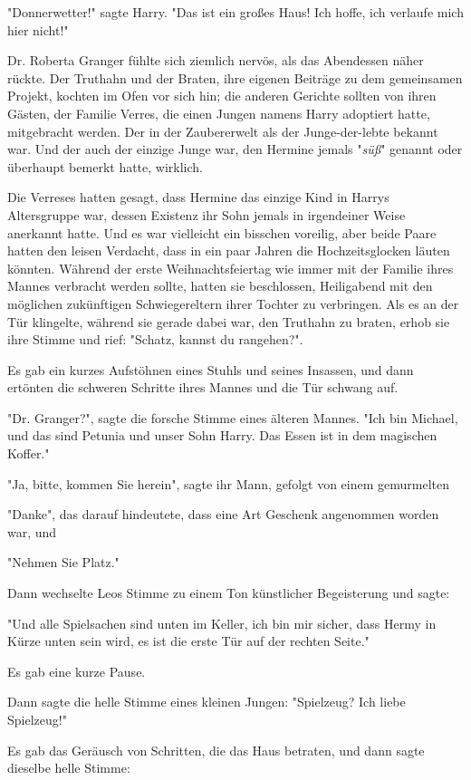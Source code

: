 {"Donnerwetter!" sagte Harry. "Das ist ein großes Haus! Ich hoffe, ich verlaufe mich hier nicht!"

Dr. Roberta Granger fühlte sich ziemlich nervös, als das Abendessen näher rückte. Der Truthahn und der Braten, ihre eigenen Beiträge zu dem gemeinsamen Projekt, kochten im Ofen vor sich hin; die anderen Gerichte sollten von ihren Gästen, der Familie Verres, die einen Jungen namens Harry adoptiert hatte, mitgebracht werden. Der in der Zaubererwelt als der Junge-der-lebte bekannt war. Und der auch der einzige Junge war, den Hermine jemals "\emph{süß}" genannt oder überhaupt bemerkt hatte, wirklich.

Die Verreses hatten gesagt, dass Hermine das einzige Kind in Harrys Altersgruppe war, dessen Existenz ihr Sohn jemals in irgendeiner Weise anerkannt hatte. Und es war vielleicht ein bisschen voreilig, aber beide Paare hatten den leisen Verdacht, dass in ein paar Jahren die Hochzeitsglocken läuten könnten. Während der erste Weihnachtsfeiertag wie immer mit der Familie ihres Mannes verbracht werden sollte, hatten sie beschlossen, Heiligabend mit den möglichen zukünftigen Schwiegereltern ihrer Tochter zu verbringen. Als es an der Tür klingelte, während sie gerade dabei war, den Truthahn zu braten, erhob sie ihre Stimme und rief: "Schatz, kannst du rangehen?".

Es gab ein kurzes Aufstöhnen eines Stuhls und seines Insassen, und dann ertönten die schweren Schritte ihres Mannes und die Tür schwang auf.

"Dr. Granger?", sagte die forsche Stimme eines älteren Mannes. "Ich bin Michael, und das sind Petunia und unser Sohn Harry. Das Essen ist in dem magischen Koffer."

"Ja, bitte, kommen Sie herein", sagte ihr Mann, gefolgt von einem gemurmelten

"Danke", das darauf hindeutete, dass eine Art Geschenk angenommen worden war, und

"Nehmen Sie Platz."

Dann wechselte Leos Stimme zu einem Ton künstlicher Begeisterung und sagte:

"Und alle Spielsachen sind unten im Keller, ich bin mir sicher, dass Hermy in Kürze unten sein wird, es ist die erste Tür auf der rechten Seite."

Es gab eine kurze Pause.

Dann sagte die helle Stimme eines kleinen Jungen: "Spielzeug? Ich liebe Spielzeug!"

Es gab das Geräusch von Schritten, die das Haus betraten, und dann sagte dieselbe helle Stimme:

}
